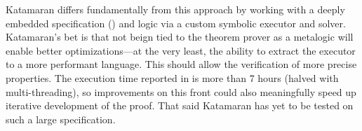 Katamaran differs fundamentally from this approach by working with a deeply embedded specification (\usail) and logic via a custom symbolic executor and solver. Katamaran's bet is that not beign tied to the theorem prover as a metalogic will enable better optimizations---at the very least, the ability to extract the executor to a more performant language. This should allow the verification of more precise properties. The execution time reported in \cite{Bauereiss2022} is more than 7 hours (halved with multi-threading), so improvements on this front could also meaningfully speed up iterative development of the proof. That said Katamaran has yet to be tested on such a large specification.





